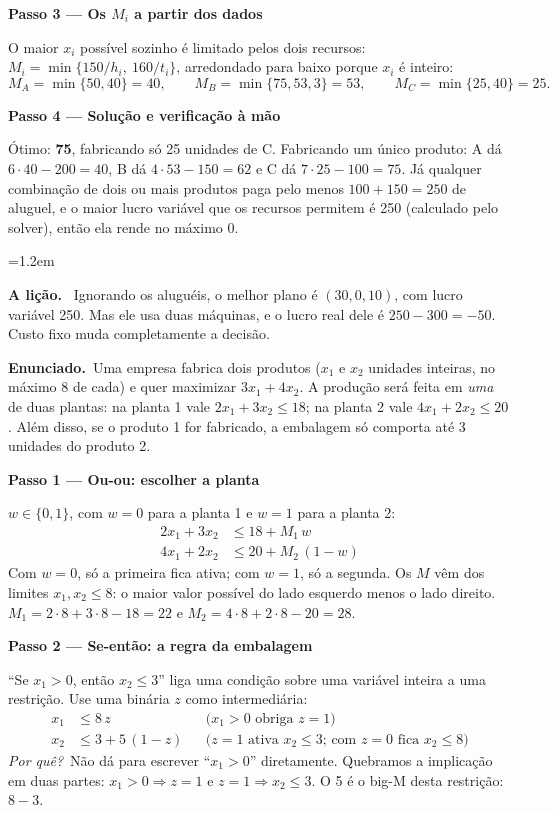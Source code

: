 \documentclass[11pt,a4paper]{article}
\newcommand{\enunciado}{\par\textbf{Enunciado.}\ }
\newcommand{\passo}[1]{\par\medskip\textbf{#1}\par}
\newcommand{\porque}{\textit{Por quê?}\ }
\newenvironment{nota}[1]{\par\smallskip\begin{list}{}{\leftmargin=1.2em\rightmargin=0pt}\item[]\textbf{#1.}\ }{\end{list}}
\begin{document}
\passo{Passo 3 --- Os $M_i$ a partir dos dados}
O maior $x_i$ possível sozinho é limitado pelos dois recursos: $M_i=\min\{150/h_i,\ 160/t_i\}$, arredondado para baixo
porque $x_i$ é inteiro:
\[
  M_A=\min\{50, 40\}=40, \qquad M_B=\min\{75, 53{,}3\}=53, \qquad M_C=\min\{25, 40\}=25 .
\]

\passo{Passo 4 --- Solução e verificação à mão}
Ótimo: \textbf{75}, fabricando só 25 unidades de C. Fabricando um único produto: A dá $6\cdot40-200=40$, B dá
$4\cdot53-150=62$ e C dá $7\cdot25-100=75$. Já qualquer combinação de dois ou mais produtos paga pelo menos
$100+150=250$ de aluguel, e o maior lucro variável que os recursos permitem é 250 (calculado pelo solver), então ela rende no máximo 0.

\begin{nota}{A lição}
Ignorando os aluguéis, o melhor plano é $(30, 0, 10)$, com lucro variável 250. Mas ele usa duas máquinas, e o lucro
real dele é $250-300=-50$. Custo fixo muda completamente a decisão.
\end{nota}

\enunciado Uma empresa fabrica dois produtos ($x_1$ e $x_2$ unidades inteiras, no máximo 8 de cada) e quer maximizar
$3x_1+4x_2$. A produção será feita em \emph{uma} de duas plantas: na planta 1 vale $2x_1+3x_2\le18$; na planta 2 vale
$4x_1+2x_2\le20$. Além disso, se o produto 1 for fabricado, a embalagem só comporta até 3 unidades do produto 2.

\passo{Passo 1 --- Ou-ou: escolher a planta}
$w\in\{0,1\}$, com $w=0$ para a planta 1 e $w=1$ para a planta 2:
\begin{align*}
  2x_1 + 3x_2 &\le 18 + M_1\,w\\
  4x_1 + 2x_2 &\le 20 + M_2\,(1-w)
\end{align*}
Com $w=0$, só a primeira fica ativa; com $w=1$, só a segunda. Os $M$ vêm dos limites $x_1,x_2\le8$: o maior valor
possível do lado esquerdo menos o lado direito. $M_1=2\cdot8+3\cdot8-18=22$ e $M_2=4\cdot8+2\cdot8-20=28$.

\passo{Passo 2 --- Se-então: a regra da embalagem}
``Se $x_1>0$, então $x_2\le3$'' liga uma condição sobre uma variável inteira a uma restrição. Use uma binária $z$ como
intermediária:
\begin{align*}
  x_1 &\le 8\,z && \text{($x_1>0$ obriga $z=1$)}\\
  x_2 &\le 3 + 5\,(1-z) && \text{($z=1$ ativa $x_2\le3$; com $z=0$ fica $x_2\le8$)}
\end{align*}
\porque Não dá para escrever ``$x_1>0$'' diretamente. Quebramos a implicação em duas partes:
$x_1>0\Rightarrow z=1$ e $z=1\Rightarrow x_2\le3$. O 5 é o big-M desta restrição: $8-3$.
\end{document}
